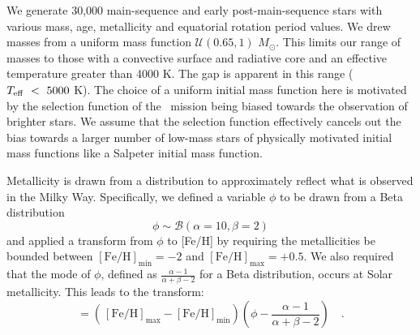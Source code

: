 

We generate 30,000 main-sequence and early post-main-sequence stars with various mass, age, metallicity and equatorial rotation period values.
We drew masses from a uniform mass function $\mathcal{U}\left(0.65,1\right)$ $M_{\odot}$.
This limits our range of masses to those with a convective surface and radiative core and an effective temperature greater than 4000 K.
The gap is apparent in this range ($T_{\rm{eff}} \ < \ 5000$ K).
The choice of a uniform initial mass function here is motivated by the selection function of the \kepler\ mission being biased towards the observation of brighter stars.
We assume that the selection function effectively cancels out the bias towards a larger number of low-mass stars of physically motivated initial mass functions like a Salpeter initial mass function.

Metallicity is drawn from a distribution to approximately reflect what is observed in the Milky Way. Specifically, we defined a variable $\phi$ to be drawn from a Beta distribution
\begin{equation}
 \phi \sim \mathcal{B}\left(\alpha=10, \beta=2\right)
\end{equation}
and applied a transform from $\phi$ to [Fe/H] by requiring the metallicities be bounded between $[\mathrm{Fe/H}]_\mathrm{min} =-2$ and $[\mathrm{Fe/H}]_\mathrm{max} = +0.5$. We also required that the mode of $\phi$, defined as $\frac{\alpha - 1}{\alpha + \beta - 2}$ for a Beta distribution, occurs at Solar metallicity. This leads to the transform:
\begin{equation}
 [\mathrm{Fe/H}] = \left(\frac{}{}[\mathrm{Fe/H}]_\mathrm{max}-[\mathrm{Fe/H}]_\mathrm{min}\right)\left(\phi - \frac{\alpha - 1}{\alpha + \beta - 2}\right) \quad .
\end{equation}

